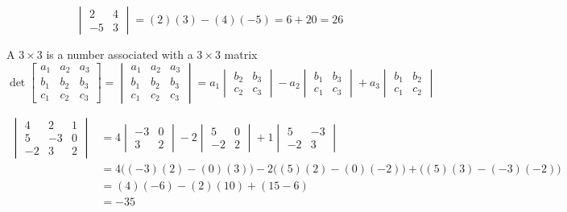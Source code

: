 \documentclass{ximera}
\begin{document}
\begin{example} \label{ex:twodetcrossprod}
$$\begin{vmatrix}
2 & 4\\
-5 & 3
\end{vmatrix} =(2)(3)-(4)(-5)=6+20=26$$
\end{example}

\begin{definition}\label{def:threedetcrossprod}
A $3\times 3$  is a number associated with a $3\times 3$ matrix
$$\det{\begin{bmatrix}
a_1 & a_2 & a_3\\
b_1 & b_2 &b_3\\
c_1 &c_2 &c_3
\end{bmatrix}}=
\begin{vmatrix}
a_1 & a_2 & a_3\\
b_1 & b_2 &b_3\\
c_1 &c_2 &c_3
\end{vmatrix} =a_1
\begin{vmatrix}
b_2 & b_3\\
c_2 & c_3
\end{vmatrix} -a_2
\begin{vmatrix}
b_1 & b_3\\
c_1 & c_3
\end{vmatrix} +a_3
\begin{vmatrix}
b_1 & b_2\\
c_1 & c_2
\end{vmatrix}
$$
\end{definition}

\begin{example} \label{ex:threedetcrossprod}
\begin{align*}
\begin{vmatrix}
4 & 2 & 1\\
5 & -3 &0\\
-2 &3 &2
\end{vmatrix}&=4
\begin{vmatrix}
-3 & 0\\
3 & 2
\end{vmatrix} -2
\begin{vmatrix}
5 & 0\\
-2 & 2
\end{vmatrix} +1
\begin{vmatrix}
5 & -3\\
-2 & 3
\end{vmatrix}\\
&=4\Big ((-3)(2)-(0)(3)\Big)-2\Big((5)(2)-(0)(-2)\Big)+\Big((5)(3)-(-3)(-2)\Big)\\
&=(4)(-6)-(2)(10)+(15-6)\\
&=-35
\end{align*}
\end{example}
\end{document}
